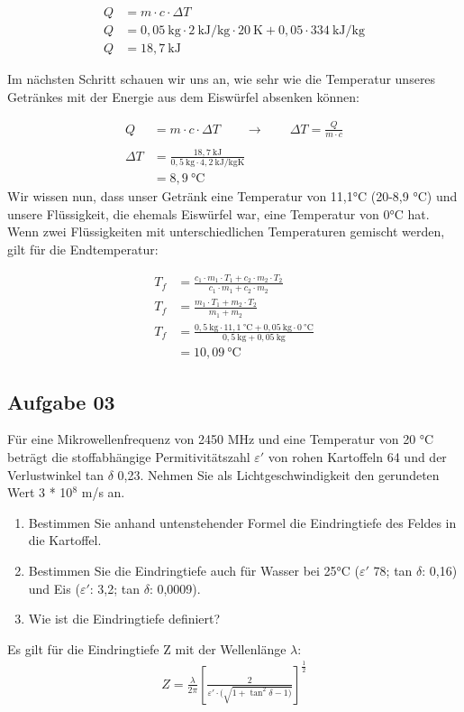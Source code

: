 \documentclass[a4paper,10pt]{article}
\begin{document}
\begin{align*}
Q &= m \cdot c \cdot \Delta T \\ 
Q &= 0,05 ~\text{kg} \cdot 2 ~\text{kJ/kg} \cdot 20 ~\text{K} + 0,05 \cdot 334 ~\text{kJ/kg} \\ 
Q &= 18,7 ~\text{kJ} 
\end{align*}

Im nächsten Schritt schauen wir uns an, wie sehr wie die Temperatur unseres Getränkes mit der Energie aus dem Eiswürfel absenken können:

\begin{align*}
Q &= m \cdot c \cdot \Delta T \qquad \rightarrow \qquad \Delta T = \frac{Q}{m \cdot c} \\ \\
\Delta T &= \frac{18,7 ~\text{kJ}}{0,5 ~\text{kg} \cdot 4,2 ~\text{kJ/kgK}} \\ 
		&= 8,9 ~\text{°C}
\end{align*}
Wir wissen nun, dass unser Getränk eine Temperatur von 11,1°C (20-8,9 °C) und unsere Flüssigkeit, die ehemals Eiswürfel war, eine Temperatur von 0°C hat. Wenn zwei Flüssigkeiten mit unterschiedlichen Temperaturen gemischt werden, gilt für die Endtemperatur: 


\begin{align*}
T_f &= \frac{c_1 \cdot m_1 \cdot T_1 + c_2 \cdot m_2 \cdot T_2}{c_1 \cdot m_1 + c_2 \cdot m_2} \\
T_f &= \frac{m_1 \cdot T_1 + m_2 \cdot T_2}{m_1 + m_2} \\
T_f &= \frac{0,5~\text{kg} \cdot 11,1 ~\text{°C} + 0,05~\text{kg} \cdot 0 ~\text{°C}}{0,5 ~\text{kg} + 0,05 ~\text{kg}} \\
	&= 10,09 ~\text{°C}
\end{align*}





\pagebreak
\subsection{Aufgabe 03}
Für eine Mikrowellenfrequenz von 2450 MHz und eine Temperatur von 20 °C beträgt die
stoffabhängige Permitivitätszahl $\varepsilon '$ von rohen Kartoffeln 64 und der Verlustwinkel tan $\delta$ 0,23.
Nehmen Sie als Lichtgeschwindigkeit den gerundeten Wert 3 * 10$^8$ m/s an.
\begin{enumerate}[label=\alph*)]

\item Bestimmen Sie anhand untenstehender Formel die Eindringtiefe des Feldes in die
Kartoffel.
\item Bestimmen Sie die Eindringtiefe auch für Wasser bei 25°C ($\varepsilon '$ 78; tan $\delta$: 0,16) und Eis
($\varepsilon '$: 3,2; tan $\delta$: 0,0009).
\item Wie ist die Eindringtiefe definiert?

\end{enumerate}
Es gilt für die Eindringtiefe Z mit der Wellenlänge $\lambda$: 
\begin{align*}
Z = \frac{\lambda}{2 \pi} \left[ \frac{2}{\varepsilon ' \cdot (\sqrt{1+ \tan^2 \delta - 1)}} \right]^{\frac{1}{2}}
\end{align*}
\end{document}

